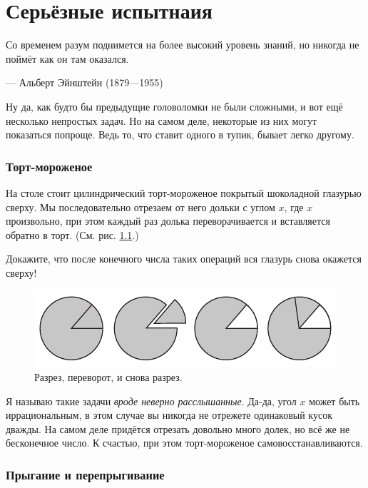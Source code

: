\chapter{Серьёзные испытнаия}


\setlength{\epigraphwidth}{.80\textwidth}
\epigraph{Со временем разум поднимется на более высокий уровень знаний, но никогда не поймёт как он там оказался.
}{--- Альберт Эйнштейн (1879---1955)}

Ну да, как будто бы предыдущие головоломки не были сложными, и вот ещё несколько непростых задач.
Но на самом деле, некоторые из них могут показаться попроще.
Ведь то, что ставит одного в тупик, бывает легко другому.


\subsection*{Торт-мороженое}

На столе стоит цилиндрический торт-мороженое покрытый шоколадной глазурью сверху.
Мы последовательно отрезаем от него дольки с углом $x$, где $x$ произвольно, при этом
каждый раз долька переворачивается и вставляется обратно в торт.
(См. рис. \ref{pic:tort}.)

Докажите, что после конечного числа таких операций вся глазурь снова окажется сверху!


\begin{figure}[htb!]
\centering
\includegraphics[scale=1]{pics/tort}
\caption{Разрез, переворот, и снова разрез.}
\label{pic:tort}
\end{figure}

Я называю такие задачи \emph{вроде неверно расслышанные}.
Да-да, угол $x$ может быть иррациональным, в этом случае вы никогда не отрежете одинаковый кусок дважды.
На самом деле придётся отрезать довольно много долек, но всё же не бесконечное число.
К счастью, при этом торт-мороженое самовосстанавливаются.

\subsection*{Прыгание и перепрыгивание}

